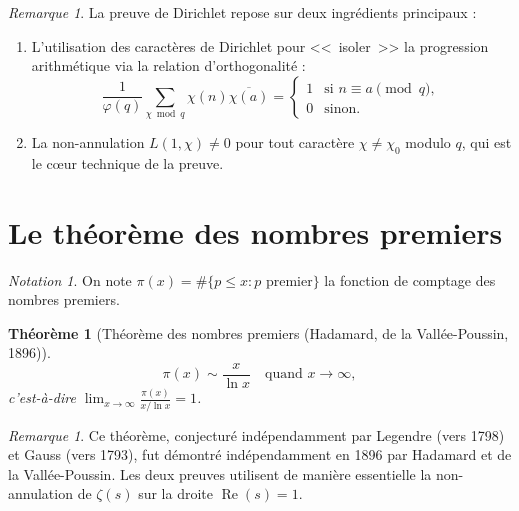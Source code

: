 \documentclass[12pt,a4paper,openany]{book}
\theoremstyle{definition}
\theoremstyle{plain}
\newtheorem{theoreme}[definition]{Théorème}
\theoremstyle{remark}
\newtheorem{remarque}[definition]{Remarque}
\newtheorem{notation}[definition]{Notation}
\begin{document}
\begin{remarque}
\label{rem:dirichlet-preuve}
La preuve de Dirichlet repose sur deux ingrédients principaux :
\begin{enumerate}[label=(\roman*)]
  \item L'utilisation des caractères de Dirichlet pour <<~isoler~>> la
    progression arithmétique via la relation d'orthogonalité :
    \[
      \frac{1}{\varphi(q)} \sum_{\chi \bmod q} \chi(n) \overline{\chi(a)}
      = \begin{cases} 1 & \text{si } n \equiv a \pmod{q}, \\ 0 & \text{sinon.} \end{cases}
    \]
  \item La non-annulation $L(1, \chi) \neq 0$ pour tout caractère $\chi \neq \chi_0$
    modulo $q$, qui est le c\oe ur technique de la preuve.
\end{enumerate}
\end{remarque}


\section{Le théorème des nombres premiers}
\label{sec:TNP}

\begin{notation}
\label{not:pi-x}
On note $\pi(x) = \#\{p \leq x : p \text{ premier}\}$
la fonction de comptage des nombres premiers.
\end{notation}

\begin{theoreme}[Théorème des nombres premiers (Hadamard, de la Vallée-Poussin, 1896)]
\label{thm:TNP}
\[
  \pi(x) \sim \frac{x}{\ln x} \quad \text{quand } x \to \infty,
\]
c'est-à-dire $\displaystyle\lim_{x \to \infty} \frac{\pi(x)}{x / \ln x} = 1$.
\end{theoreme}

\begin{remarque}
\label{rem:TNP-historique}
Ce théorème, conjecturé indépendamment par Legendre
(vers 1798) et Gauss (vers 1793), fut démontré
indépendamment en 1896 par Hadamard et de la Vallée-Poussin. Les deux preuves
utilisent de manière essentielle la non-annulation de $\zeta(s)$ sur la droite
$\operatorname{Re}(s) = 1$.
\end{remarque}
\end{document}
